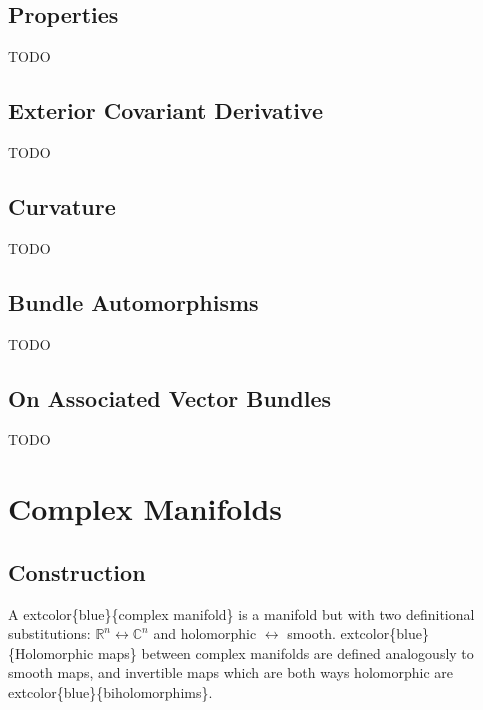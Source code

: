 \documentclass[
]{book}
\begin{document}
\hypertarget{properties}{%
\section{Properties}\label{properties}}

TODO

\hypertarget{exterior-covariant-derivative}{%
\section{Exterior Covariant Derivative}\label{exterior-covariant-derivative}}

TODO

\hypertarget{curvature}{%
\section{Curvature}\label{curvature}}

TODO

\hypertarget{bundle-automorphisms}{%
\section{Bundle Automorphisms}\label{bundle-automorphisms}}

TODO

\hypertarget{on-associated-vector-bundles}{%
\section{On Associated Vector Bundles}\label{on-associated-vector-bundles}}

TODO

\hypertarget{complex-manifolds}{%
\chapter{Complex Manifolds}\label{complex-manifolds}}

\hypertarget{construction-3}{%
\section{Construction}\label{construction-3}}

A extcolor\{blue\}\{complex manifold\} is a manifold but with two definitional substitutions: \(\mathbb{R}^n \leftrightarrow \mathbb{C}^n\) and holomorphic \(\leftrightarrow\) smooth.
extcolor\{blue\}\{Holomorphic maps\} between complex manifolds are defined analogously to smooth maps, and invertible maps which are both ways holomorphic are extcolor\{blue\}\{biholomorphims\}.
\end{document}
